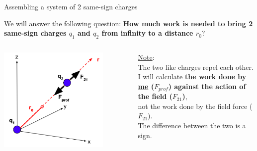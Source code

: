 %
%
%

\begin{frame}{Assembling a system of 2 same-sign charges}

We will answer the following question:
{\bf How much work is needed to bring 2 same-sign charges $q_1$ and $q_2$ from infinity to a distance $r_0$}?\\
\vspace{0.2cm}

\begin{columns}
  \begin{column}{0.70\textwidth}
   \begin{center}
     \includegraphics[width=0.80\textwidth]{./images/schematics/work_2_like_charges_2_q1q2.png}\\
   \end{center}
  \end{column}
  \begin{column}{0.30\textwidth}
   {\small
     \underline{Note}: \\
     \vspace{0.2cm}
     The two like charges repel each other.\\
     \vspace{0.2cm}
     I will calculate {\bf the work done by \underline{me} ($F_{prof}$)
     against the action of the field ($F_{21}$)},\\
     not the work done by the field force ($F_{21}$).\\
     \vspace{0.2cm}
     The difference between the two is a sign.\\
   }
  \end{column}
\end{columns}

\end{frame}

